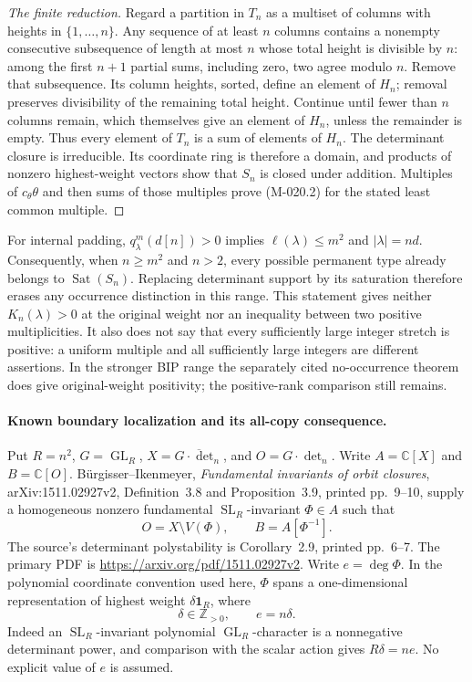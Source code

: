\begin{proof}[The finite reduction]
Regard a partition in \(T_n\) as a multiset of columns with
heights in \(\{1,\ldots,n\}\). Any sequence of at least \(n\)
columns contains a nonempty consecutive subsequence of length
at most \(n\) whose total height is divisible by \(n\): among
the first \(n+1\) partial sums, including zero, two agree
modulo \(n\). Remove that subsequence. Its column heights,
sorted, define an element of \(H_n\); removal preserves
divisibility of the remaining total height. Continue until
fewer than \(n\) columns remain, which themselves give an
element of \(H_n\), unless the remainder is empty.
Thus every element of \(T_n\) is a sum of elements of \(H_n\).
The determinant closure is irreducible. Its coordinate ring
is therefore a domain, and products of nonzero highest-weight
vectors show that \(S_n\) is closed under addition. Multiples
of \(c_\theta\theta\) and then sums of those multiples prove
(M-020.2) for the stated least common multiple.
\end{proof}

For internal padding, \(q^m_\lambda(d[n])>0\) implies
\(\ell(\lambda)\leq m^2\) and \(|\lambda|=nd\).
Consequently, when \(n\geq m^2\) and \(n>2\), every possible
permanent type already belongs to \(\operatorname{Sat}(S_n)\).
Replacing determinant support by its saturation therefore erases
any occurrence distinction in this range. This statement gives
neither \(K_n(\lambda)>0\) at the original weight nor an inequality
between two positive multiplicities. It also does not say that
every sufficiently large integer stretch is positive: a uniform
multiple and all sufficiently large integers are different assertions.
In the stronger BIP range the separately cited no-occurrence theorem
does give original-weight positivity; the positive-rank comparison
still remains.

\paragraph{Known boundary localization and its all-copy consequence.}
Put \(R=n^2\), \(G=\operatorname{GL}_R\),
\(X=\overline{G\cdot\det_n}\), and \(O=G\cdot\det_n\).
Write \(A=\mathbb C[X]\) and \(B=\mathbb C[O]\).
B\"urgisser--Ikenmeyer, \emph{Fundamental invariants of orbit closures},
arXiv:1511.02927v2, Definition~3.8 and Proposition~3.9,
printed pp.~9--10, supply a homogeneous nonzero fundamental
\(\operatorname{SL}_R\)-invariant \(\Phi\in A\) such that
\[
             O=X\setminus V(\Phi),\qquad B=A[\Phi^{-1}].
                                                               \tag{M-020.4}
\]
The source's determinant polystability is Corollary~2.9,
printed pp.~6--7. The primary PDF is
\url{https://arxiv.org/pdf/1511.02927v2}.
Write \(e=\deg\Phi\). In the polynomial coordinate convention
used here, \(\Phi\) spans a one-dimensional representation
of highest weight \(\delta\mathbf1_R\), where
\[
                 \delta\in\mathbb Z_{>0},\qquad e=n\delta.
                                                               \tag{M-020.5}
\]
Indeed an \(\operatorname{SL}_R\)-invariant polynomial
\(\operatorname{GL}_R\)-character is a nonnegative determinant
power, and comparison with the scalar action gives
\(R\delta=ne\). No explicit value of \(e\) is assumed.

